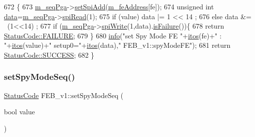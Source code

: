 \begin{DoxyCode}
672                                                    \{
673   \hyperlink{classFEB__v1_a6c7804ac86796f233a8393043adf2e77}{m\_seqPga}->\hyperlink{classSeqPGA_ac998ce3a6d9b5f2e88cc8393f8c1df53}{setSpiAdd}(\hyperlink{classFEB__v1_a4e1945c2d5b434125f375e9d0fc6d99f}{m\_feAddress}[fe]);
674   \textcolor{keywordtype}{unsigned} \textcolor{keywordtype}{int} \hyperlink{classFEB__v1_a6bca4320bd3bbbc32efc81097f33421a}{data}=\hyperlink{classFEB__v1_a6c7804ac86796f233a8393043adf2e77}{m\_seqPga}->\hyperlink{classSeqPGA_ab3d0e5e5d4014bc7a92588a76b8713d4}{spiRead}(1);
675   \textcolor{keywordflow}{if} (value)  data |= 1 << 14  ;
676   \textcolor{keywordflow}{else}        data &= ~(1<<14) ;
677   \textcolor{keywordflow}{if} (\hyperlink{classFEB__v1_a6c7804ac86796f233a8393043adf2e77}{m\_seqPga}->\hyperlink{classSeqPGA_ad4421841ce4ce8b88ad13f63216f0743}{spiWrite}(1,data).\hyperlink{classStatusCode_a5dd22dc6eb2c52fc4cabc58f6dea2eb7}{isFailure}())\{
678     \textcolor{keywordflow}{return} \hyperlink{classStatusCode_a6f565cbeadc76d14c72f047e5e85eb4ba3da73d4c469762eb9d3c960368252b26}{StatusCode::FAILURE};
679   \}
680   \hyperlink{classObject_a644fd329ea4cb85f54fa6846484b84a8}{info}(\textcolor{stringliteral}{"set Spy Mode FE "}+\hyperlink{Tools_8h_af330027dbdafb9a30768b3613c553e60}{itos}(fe)+\textcolor{stringliteral}{" : "}+\hyperlink{Tools_8h_af330027dbdafb9a30768b3613c553e60}{itos}(value)+\textcolor{stringliteral}{" setup0="}+\hyperlink{Tools_8h_af330027dbdafb9a30768b3613c553e60}{itos}(data),\textcolor{stringliteral}{"
      FEB\_v1::spyModeFE"});
681   \textcolor{keywordflow}{return} \hyperlink{classStatusCode_a6f565cbeadc76d14c72f047e5e85eb4badd0da38d3ba0d922efd1f4619bc37ad8}{StatusCode::SUCCESS};
682 \}
\end{DoxyCode}
\mbox{\label{classFEB__v1_a9e13da349fc335ec44032fa0426c40d0}} 
\subsubsection{\texorpdfstring{set\+Spy\+Mode\+Seq()}{setSpyModeSeq()}}
{\footnotesize\ttfamily \hyperlink{classStatusCode}{Status\+Code} F\+E\+B\+\_\+v1\+::set\+Spy\+Mode\+Seq (\begin{DoxyParamCaption}\item[{bool}]{value }\end{DoxyParamCaption})}



